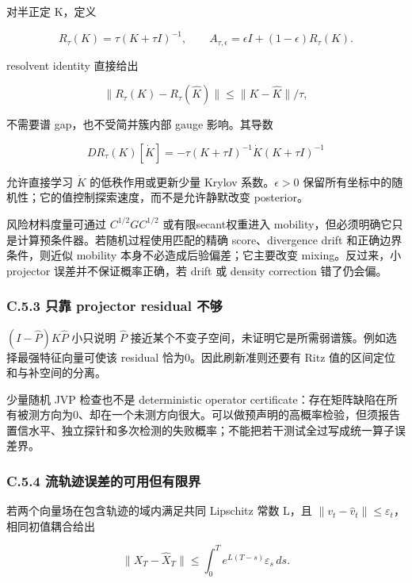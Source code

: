 \documentclass[
  11pt,
  a4paper,
]{article}
\begin{document}
对半正定 K，定义

\[
R_\tau(K)=\tau(K+\tau I)^{-1},\qquad
A_{\tau,\epsilon}=\epsilon I+(1-\epsilon)R_\tau(K).
\]

resolvent identity 直接给出

\[
\|R_\tau(K)-R_\tau(\widehat K)\|\le\|K-\widehat K\|/\tau,
\]

不需要谱 gap，也不受简并簇内部 gauge 影响。其导数

\[
DR_\tau(K)[\dot K]=-\tau(K+\tau I)^{-1}\dot K(K+\tau I)^{-1}
\]

允许直接学习 \(\dot K\) 的低秩作用或更新少量 Krylov 系数。\(\epsilon>0\)
保留所有坐标中的随机性；它的值控制探索速度，而不是允许静默改变
posterior。

风险材料度量可通过 \(C^{1/2}GC^{1/2}\) 或有限secant权重进入
mobility，但必须明确它只是计算预条件器。若随机过程使用匹配的精确
score、divergence drift 和正确边界条件，则近似 mobility
本身不必造成后验偏差；它主要改变 mixing。反过来，小 projector
误差并不保证概率正确，若 drift 或 density correction 错了仍会偏。

\hypertarget{c.5.3-ux53eaux9760-projector-residual-ux4e0dux591f}{%
\subsubsection{C.5.3 只靠 projector residual
不够}\label{c.5.3-ux53eaux9760-projector-residual-ux4e0dux591f}}

\((I-\widehat P)K\widehat P\) 小只说明 \(\widehat P\)
接近某个不变子空间，未证明它是所需弱谱簇。例如选择最强特征向量可使该
residual 恰为0。因此刷新准则还要有 Ritz 值的区间定位和与补空间的分离。

少量随机 JVP 检查也不是 deterministic operator
certificate：存在矩阵缺陷在所有被测方向为0、却在一个未测方向很大。可以做预声明的高概率检验，但须报告置信水平、独立探针和多次检测的失败概率；不能把若干测试全过写成统一算子误差界。

\hypertarget{c.5.4-ux6d41ux8f68ux8ff9ux8befux5deeux7684ux53efux7528ux4f46ux6709ux9650ux754c}{%
\subsubsection{C.5.4
流轨迹误差的可用但有限界}\label{c.5.4-ux6d41ux8f68ux8ff9ux8befux5deeux7684ux53efux7528ux4f46ux6709ux9650ux754c}}

若两个向量场在包含轨迹的域内满足共同 Lipschitz 常数 L，且
\(\|v_t-\widehat v_t\|\le\varepsilon_t\)，相同初值耦合给出

\[
\|X_T-\widehat X_T\|\le\int_0^T e^{L(T-s)}\varepsilon_s\,ds.
\]
\end{document}
